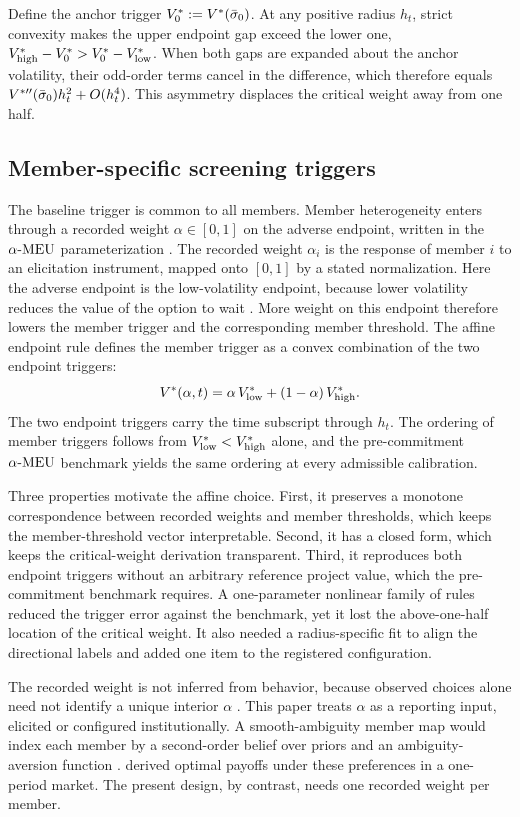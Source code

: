 Define the anchor trigger $V^{*}_{0}:=V^{*}(\bar{\sigma}_0)$. At any positive radius $h_t$, strict convexity makes the upper endpoint gap exceed the lower one, $V^{*}_{\mathrm{high}}-V^{*}_{0}>V^{*}_{0}-V^{*}_{\mathrm{low}}$. When both gaps are expanded about the anchor volatility, their odd-order terms cancel in the difference, which therefore equals $V^{*\prime\prime}(\bar{\sigma}_0)h_t^{2}+O(h_t^{4})$. This asymmetry displaces the critical weight away from one half.

\subsection{Member-specific screening triggers}

The baseline trigger is common to all members. Member heterogeneity enters through a recorded weight $\alpha\in[0,1]$ on the adverse endpoint, written in the $\alpha\text{-MEU}$ parameterization \citep{Ghirardato2004}. The recorded weight $\alpha_i$ is the response of member $i$ to an elicitation instrument, mapped onto $[0,1]$ by a stated normalization. Here the adverse endpoint is the low-volatility endpoint, because lower volatility reduces the value of the option to wait \citep{DixitPindyck1994}. More weight on this endpoint therefore lowers the member trigger and the corresponding member threshold. The affine endpoint rule defines the member trigger as a convex combination of the two endpoint triggers:
\begin{equation}
V^{*}(\alpha,t)=\alpha\,V^{*}_{\mathrm{low}}+(1-\alpha)\,V^{*}_{\mathrm{high}}.
\label{eq:affine}
\end{equation}
The two endpoint triggers carry the time subscript through $h_t$. The ordering of member triggers follows from $V^{*}_{\mathrm{low}}<V^{*}_{\mathrm{high}}$ alone, and the pre-commitment $\alpha\text{-MEU}$ benchmark yields the same ordering at every admissible calibration.

Three properties motivate the affine choice. First, it preserves a monotone correspondence between recorded weights and member thresholds, which keeps the member-threshold vector interpretable. Second, it has a closed form, which keeps the critical-weight derivation transparent. Third, it reproduces both endpoint triggers without an arbitrary reference project value, which the pre-commitment benchmark requires. A one-parameter nonlinear family of rules reduced the trigger error against the benchmark, yet it lost the above-one-half location of the critical weight. It also needed a radius-specific fit to align the directional labels and added one item to the registered configuration.

The recorded weight is not inferred from behavior, because observed choices alone need not identify a unique interior $\alpha$ \citep{Eichberger2011}. This paper treats $\alpha$ as a reporting input, elicited or configured institutionally. A smooth-ambiguity member map would index each member by a second-order belief over priors and an ambiguity-aversion function \citep{Klibanoff2005}. \citet{ChenA2025} derived optimal payoffs under these preferences in a one-period market. The present design, by contrast, needs one recorded weight per member.

